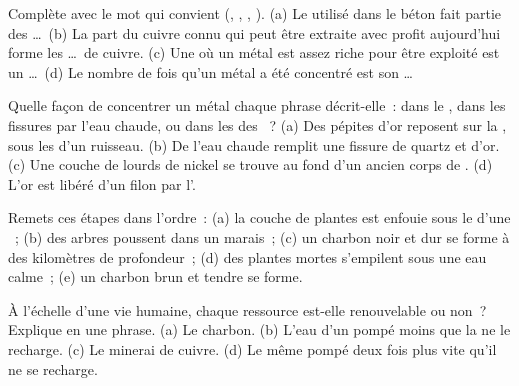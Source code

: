 \begin{exercise}[$\star$]\label{exo:g9:earth-resources:1}
Complète avec le mot qui convient (, ,
, ). (a) Le  utilisé dans le béton fait partie des
\ldots\ (b) La part du cuivre connu qui peut être extraite avec profit
aujourd'hui forme les \ldots\ de cuivre. (c) Une  où un métal est
assez riche pour être exploité est un \ldots\ (d) Le nombre de fois qu'un
métal a été concentré est son \ldots
\end{exercise}

\begin{exercise}[$\star$]\label{exo:g9:earth-resources:2}
Quelle façon de concentrer un métal chaque phrase décrit-elle~: dans le
, dans les fissures par l'eau chaude, ou dans les  des
~? (a) Des pépites d'or reposent sur la , sous les
 d'un ruisseau. (b) De l'eau chaude remplit une fissure de quartz
et d'or. (c) Une couche de  lourds de nickel se trouve au fond
d'un ancien corps de . (d) L'or est libéré d'un filon par l'.
\end{exercise}

\begin{exercise}[$\star$]\label{exo:g9:earth-resources:3}
Remets ces étapes dans l'ordre~: (a) la couche de plantes est enfouie sous
le  d'une ~; (b) des arbres poussent dans un marais~; (c) un
charbon noir et dur se forme à des kilomètres de profondeur~; (d) des
plantes mortes s'empilent sous une eau calme~; (e) un charbon brun et
tendre se forme.
\end{exercise}

\begin{exercise}[$\star$]\label{exo:g9:earth-resources:4}
À l'échelle d'une vie humaine, chaque ressource est-elle renouvelable ou
non~? Explique en une phrase. (a) Le charbon. (b) L'eau d'un 
pompé moins que la  ne le recharge. (c) Le minerai de cuivre. (d) Le
même  pompé deux fois plus vite qu'il ne se recharge.
\end{exercise}


